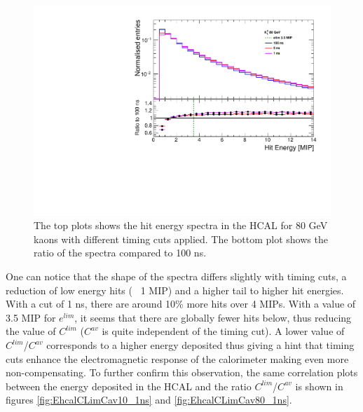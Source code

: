 \begin{figure}[htbp!]
  \centering
  \includegraphics[width=0.7\linewidth]{../Thesis_Plots/ILD/AdditionalPlots/Plots/HitEnergySpectra_80GeV.pdf}
  \caption{The top plots shows the hit energy spectra in the HCAL for 80 GeV kaons with different timing cuts applied. The bottom plot shows the ratio of the spectra compared to 100 ns.} \label{fig:HitSpectra80_timingcuts}
\end{figure}

One can notice that the shape of the spectra differs slightly with timing cuts, a reduction of low energy hits (~ 1 MIP) and a higher tail to higher hit energies. With a cut of 1 ns, there are around 10\% more hits over 4 MIPs. With a value of 3.5 MIP for $e^{lim}$, it seems that there are globally fewer hits below, thus reducing the value of $C^{lim}$ ($C^{av}$ is quite independent of the timing cut). A lower value of $C^{lim}$/$C^{av}$ corresponds to a higher energy deposited thus giving a hint that timing cuts enhance the electromagnetic response of the calorimeter making even more non-compensating. To further confirm this observation, the same correlation plots between the energy deposited in the HCAL and the ratio $C^{lim}$/$C^{av}$ is shown in figures \ref{fig:EhcalCLimCav10_1ns} and \ref{fig:EhcalCLimCav80_1ns}.


